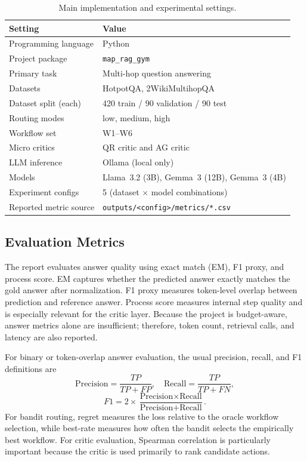 \documentclass[12pt,a4paper]{article}
\begin{document}
\begin{table}[H]
\centering
\caption{Main implementation and experimental settings.}
\label{tab:training_settings}
\begin{tabular}{ll}
\toprule
\textbf{Setting} & \textbf{Value} \\
\midrule
Programming language & Python \\
Project package & \texttt{map\_rag\_gym} \\
Primary task & Multi-hop question answering \\
Datasets & HotpotQA, 2WikiMultihopQA \\
Dataset split (each) & 420 train / 90 validation / 90 test \\
Routing modes & low, medium, high \\
Workflow set & W1--W6 \\
Micro critics & QR critic and AG critic \\
LLM inference & Ollama (local only) \\
Models & Llama~3.2 (3B), Gemma~3 (12B), Gemma~3 (4B) \\
Experiment configs & 5 (dataset $\times$ model combinations) \\
Reported metric source & \texttt{outputs/<config>/metrics/*.csv} \\
\bottomrule
\end{tabular}
\end{table}

\subsection{Evaluation Metrics}

The report evaluates answer quality using exact match (EM), F1 proxy, and process score. EM captures whether the predicted answer exactly matches the gold answer after normalization. F1 proxy measures token-level overlap between prediction and reference answer. Process score measures internal step quality and is especially relevant for the critic layer. Because the project is budget-aware, answer metrics alone are insufficient; therefore, token count, retrieval calls, and latency are also reported.

For binary or token-overlap answer evaluation, the usual precision, recall, and F1 definitions are
\begin{equation}
    \text{Precision} = \frac{TP}{TP + FP}, \quad
    \text{Recall} = \frac{TP}{TP + FN},
\end{equation}
\begin{equation}
    F1 = 2 \times \frac{\text{Precision} \times \text{Recall}}{\text{Precision} + \text{Recall}}.
\end{equation}
For bandit routing, regret measures the loss relative to the oracle workflow selection, while best-rate measures how often the bandit selects the empirically best workflow. For critic evaluation, Spearman correlation is particularly important because the critic is used primarily to rank candidate actions.
\end{document}
